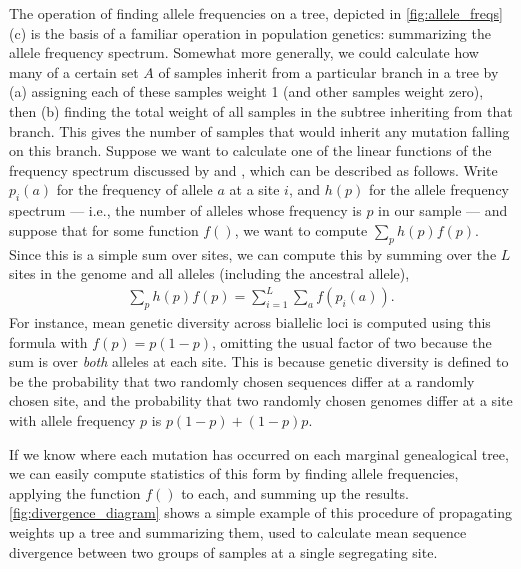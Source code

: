 \documentclass{article}
\begin{document}
The operation of finding allele frequencies on a tree,
depicted in \autoref{fig:allele_freqs}(c)
is the basis of a familiar operation in population genetics:
summarizing the allele frequency spectrum.
Somewhat more generally, we could calculate how many of a certain set $A$ of samples
inherit from a particular branch in a tree
by (a) assigning each of these samples weight 1 (and other samples weight zero), then
(b) finding the total weight of all samples in the subtree inheriting from that branch.
This gives the number of samples that would inherit any mutation falling on this branch.
Suppose we want to calculate one of the linear functions of the frequency spectrum
discussed by \citet{fu1995statistical} and \citet{achaz2009frequency},
which can be described as follows.
Write $p_i(a)$ for the frequency of allele $a$ at a site $i$,
and $h(p)$ for the allele frequency spectrum
--- i.e., the number of alleles whose frequency is $p$ in our sample ---
and suppose that for some function $f()$, we want to compute $\sum_p h(p) f(p)$.
Since this is a simple sum over sites,
we can compute this by summing over the $L$ sites in the genome and all alleles
(including the ancestral allele),
\begin{align*}
    \sum_p h(p) f(p) = \sum_{i=1}^L \sum_a f(p_i(a)).
\end{align*}
For instance, mean genetic diversity across biallelic loci is computed using this formula
with $f(p) = p (1-p)$,
omitting the usual factor of two because the sum is over \emph{both} alleles at each site.
This is because genetic diversity is defined to be the probability that two randomly chosen sequences
differ at a randomly chosen site,
and the probability that two randomly chosen genomes differ at a site with allele frequency $p$
is $p (1-p) + (1-p) p$.

If we know where each mutation has occurred on each marginal genealogical tree,
we can easily compute statistics of this form
by finding allele frequencies, applying the function $f( )$ to each,
and summing up the results.
\autoref{fig:divergence_diagram} shows a simple example of this procedure
of propagating weights up a tree and summarizing them,
used to calculate mean sequence divergence between two groups of samples at a single segregating site.
\end{document}
